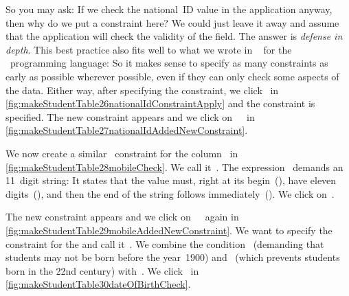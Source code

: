 So you may ask:
If we check the national~ID value in the application anyway, then why do we put a constraint here?
We could just leave it away and assume that the application will check the validity of the field.
The answer is \emph{defense in depth}.%
%
%
%
This best practice also fits well to what we wrote in ~\cite{programmingWithPython} for the \python\ programming language:%
%
%
%
So it makes sense to specify as many constraints as early as possible wherever possible, even if they can only check some aspects of the data.
Either way, after specifying the constraint, we click~ in \cref{fig:makeStudentTable26nationalIdConstraintApply} and the constraint is specified.
The new constraint appears and we click on~~\pgmodelerAddItem\ in \cref{fig:makeStudentTable27nationalIdAddedNewConstraint}.

We now create a similar ~constraint for the column~ in \cref{fig:makeStudentTable28mobileCheck}.
We call it~.
The expression~ demands an 11~digit string:
It states that the  value must, right at its begin~(\textil{^}), have eleven digits~(), and then the end of the string follows immediately~(\textil{\$}).
We click on~.

The new constraint appears and we click on~~\pgmodelerAddItem\ again in \cref{fig:makeStudentTable29mobileAddedNewConstraint}.
We want to specify the  constraint for the  and call it~.
We combine the condition ~(demanding that students may not be born before the year~1900) and ~(which prevents students born in the 22nd century) with~.
We click~ in \cref{fig:makeStudentTable30dateOfBirthCheck}.

